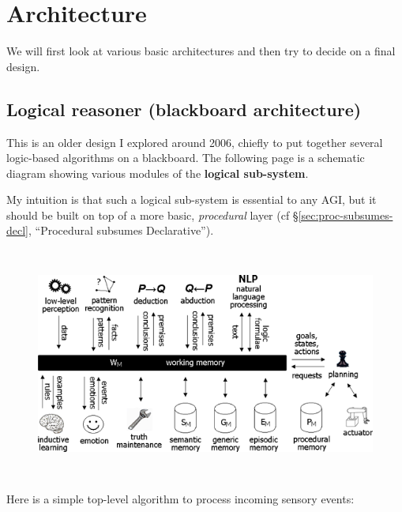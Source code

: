 \chapter{Architecture}
\minitoc

We will first look at various basic architectures and then try to decide on a final design.

\section{Logical reasoner (blackboard architecture)}
\label{sec:blackboard-architecture}

This is an older design I explored around 2006, chiefly to put together several logic-based algorithms on a blackboard.  The following page is a schematic diagram showing various modules of the \textbf{logical sub-system}.

My intuition is that such a logical sub-system is essential to any AGI, but it should be built on top of a more basic, \textit{procedural} layer (cf \S\ref{sec:proc-subsumes-decl}, ``Procedural subsumes Declarative'').

\begin{figure}[H]
\centering
\includegraphics[width=5.65625in,height=2.9895833in,viewport=0 0 543 287]{blackboard-architecture.png}
\end{figure}

Here is a simple top-level algorithm to process incoming sensory events:

